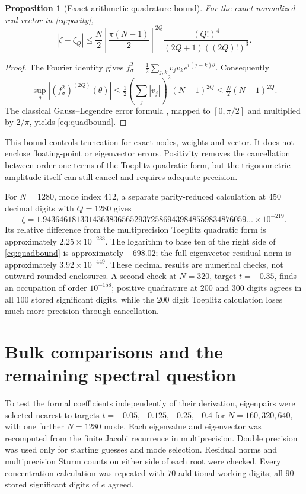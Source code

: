 \documentclass[10pt]{article}
\newtheorem{proposition}{Proposition}
\begin{document}
\begin{proposition}[Exact-arithmetic quadrature bound]
For the exact normalized real vector in \eqref{eq:parity},
\begin{equation}
 |\zeta-\zeta_Q|\le\frac N2\left[\frac{\pi(N-1)}2\right]^{2Q}
          \frac{(Q!)^4}{(2Q+1)((2Q)!)^3}.
 \label{eq:quadbound}
\end{equation}
\end{proposition}
\begin{proof}
The Fourier identity gives
$f_\sigma^2=\frac12\sum_{j,k}v_jv_k e^{i(j-k)\theta}$.
Consequently
\[
 \sup_\theta |(f_\sigma^2)^{(2Q)}(\theta)|
 \le\tfrac12(\textstyle\sum_j|v_j|)^2(N-1)^{2Q}
 \le\tfrac N2(N-1)^{2Q}.
\]
The classical Gauss--Legendre error formula \cite{quadrature}, mapped to $[0,\pi/2]$ and multiplied by $2/\pi$, yields \eqref{eq:quadbound}.
\end{proof}

This bound controls truncation for exact nodes, weights and vector. It does not enclose floating-point or eigenvector errors. Positivity removes the cancellation between order-one terms of the Toeplitz quadratic form, but the trigonometric amplitude itself can still cancel and requires adequate precision.

For $N=1280$, mode index $412$, a separate parity-reduced calculation at $450$ decimal digits with $Q=1280$ gives
\[
 \zeta=1.9436461813314363836565293725869439848559834876059\ldots\times10^{-219}.
\]
Its relative difference from the multiprecision Toeplitz quadratic form is approximately $2.25\times10^{-233}$. The logarithm to base ten of the right side of \eqref{eq:quadbound} is approximately $-698.02$; the full eigenvector residual norm is approximately $3.92\times10^{-449}$. These decimal results are numerical checks, not outward-rounded enclosures. A second check at $N=320$, target $t=-0.35$, finds an occupation of order $10^{-158}$; positive quadrature at $200$ and $300$ digits agrees in all $100$ stored significant digits, while the $200$ digit Toeplitz calculation loses much more precision through cancellation.

\section{Bulk comparisons and the remaining spectral question}
To test the formal coefficients independently of their derivation, eigenpairs were selected nearest to targets $t=-0.05,-0.125,-0.25,-0.4$ for $N=160,320,640$, with one further $N=1280$ mode. Each eigenvalue and eigenvector was recomputed from the finite Jacobi recurrence in multiprecision. Double precision was used only for starting guesses and mode selection. Residual norms and multiprecision Sturm counts on either side of each root were checked. Every concentration calculation was repeated with $70$ additional working digits; all $90$ stored significant digits of $e$ agreed.
\end{document}
